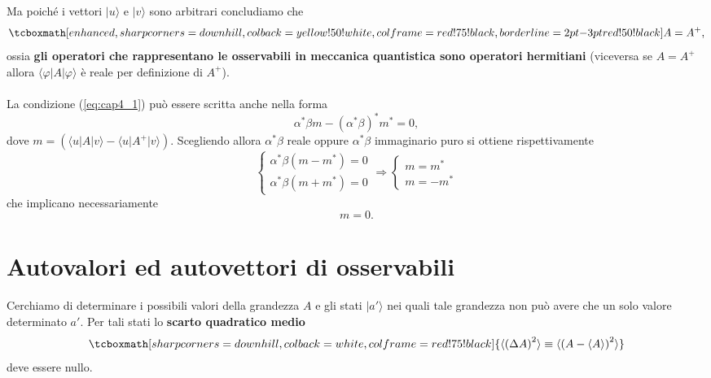 \documentclass[a4paper,12pt,oneside]{book}
\begin{document}
Ma poiché i vettori $\vert u \rangle$ e $\vert v \rangle$ sono arbitrari concludiamo che
	\begin{equation}
		\tcboxmath[enhanced,sharp corners=downhill ,colback=yellow!50!white,colframe=red!75!black, borderline={2pt}{-3pt}{red!50!black}]{
			A= A^{+},
			}
	\end{equation}
ossia \textbf{gli operatori che rappresentano le osservabili in meccanica quantistica sono operatori hermitiani} (viceversa se $A= A^{+}$ allora $\langle \varphi \vert A \vert \varphi \rangle$ è reale per definizione di $A^{+}$).\\ \\

La condizione (\ref{eq:cap4_1}) può essere scritta anche nella forma
	\begin{equation}
		\alpha ^* \beta m - \left( \alpha ^*  \beta \right) ^* m^* =0, 
	\end{equation}
dove $m= \left( \langle u \vert A \vert v \rangle - \langle u \vert A^{+} \vert v \rangle \right)$. Scegliendo allora $\alpha ^* \beta$ reale oppure $\alpha ^* \beta$ immaginario puro si ottiene rispettivamente
	\begin{equation}
		\begin{cases}
		\alpha ^* \beta \left( m- m^* \right) =0 \\
		\alpha ^* \beta \left( m + m^* \right) =0
		\end{cases}
		\Rightarrow
		\begin{cases}
		m= m^*\\
		m= - m^*
		\end{cases}
	\end{equation}
che implicano necessariamente
	\begin{equation}
		m=0.
	\end{equation}
\section{Autovalori ed autovettori di osservabili}
Cerchiamo di determinare i possibili valori della grandezza $A$ e gli stati $\vert a' \rangle$ nei quali tale grandezza non può avere che un solo valore determinato $a'$. Per tali stati lo \textbf{scarto quadratico medio} 	
	\begin{equation}
		\tcboxmath[sharp corners=downhill ,colback=white,colframe=red!75!black]{
			\langle \left( \Delta A \right) ^2 \rangle \equiv \langle \left( A- \langle A\rangle \right) ^2 \rangle
			}
	\end{equation}
deve essere nullo.\\
\end{document}
